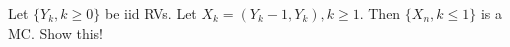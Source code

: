\documentclass{report}
\begin{document}
%
%
%
   {
    Let $\{Y_k, k\geq 0\}$ be iid RVs.  Let $X_k=(Y_k-1, Y_k), k \geq 1$.  
    Then $\{X_n, k \leq 1\}$ is a MC.  Show this!
  }
\end{document}
